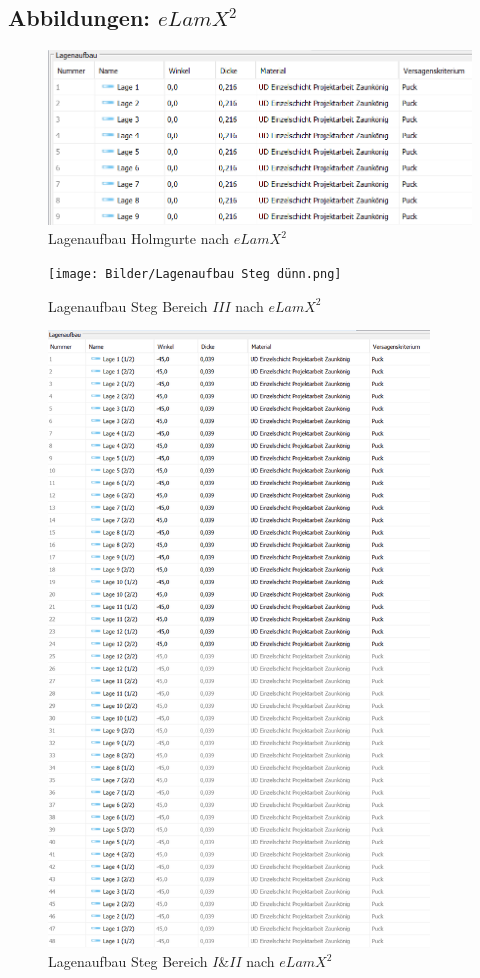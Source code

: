 \subsection{Abbildungen: $eLamX^{2}$}\label{Abbildungen}
\begin{figure}[h]
	\includegraphics[width=1.0\textwidth]{Bilder/Lagenaufbau Holmgurte.png}
	\caption{Lagenaufbau Holmgurte nach $eLamX^{2}$}
	\label{fig:Lagenaufbau Holmgurte}
\end{figure}
\begin{figure}[h]
	\texttt{[image: Bilder/Lagenaufbau Steg dünn.png]}
	\caption{Lagenaufbau Steg Bereich $III$ nach $eLamX^{2}$}
	\label{fig:Lagenaufbau Steg dünn}
\end{figure}
\begin{figure}[h]
	\includegraphics[width=0.9\textwidth]{Bilder/Lagenaufbau Steg dick.png}
	\caption{Lagenaufbau Steg Bereich $I$\&$II$ nach $eLamX^{2}$}
	\label{fig:Lagenaufbau Steg dick}
\end{figure}
